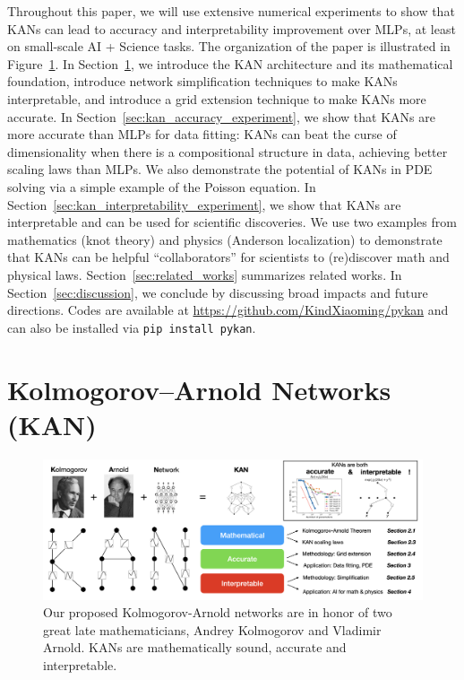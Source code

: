 \documentclass{article}
\numberwithin{equation}{section}
\numberwithin{figure}{section}
\begin{document}
Throughout this paper, we will use extensive numerical experiments to show that KANs can lead to accuracy and interpretability improvement over MLPs, at least on small-scale AI + Science tasks. The organization of the paper is illustrated in Figure~\ref{fig:flow-chart}. In Section~\ref{sec:KAN}, we introduce the KAN architecture and its mathematical foundation, introduce network simplification techniques to make KANs interpretable, and introduce a grid extension technique to make KANs more accurate. In Section~\ref{sec:kan_accuracy_experiment}, we show that KANs are more accurate than MLPs for data fitting: KANs can beat the curse of dimensionality when there is a compositional structure in data, achieving better scaling laws than MLPs. We also demonstrate the potential of KANs in PDE solving via a simple example of the Poisson equation. In Section~\ref{sec:kan_interpretability_experiment}, we show that KANs are interpretable and can be used for scientific discoveries. We use two examples from mathematics (knot theory) and physics (Anderson localization) %
to demonstrate that KANs can be helpful ``collaborators'' for scientists to (re)discover math and physical laws. Section~\ref{sec:related_works} summarizes related works. In Section~\ref{sec:discussion}, we conclude by discussing broad impacts and future directions. Codes are available at \url{https://github.com/KindXiaoming/pykan} and can also be installed via \texttt{pip install pykan}.

\section{Kolmogorov–Arnold Networks (KAN)}\label{sec:KAN}

\begin{figure}[t]
    \centering
    \includegraphics[width=1\linewidth]{figs/flowchart.png}
    \caption{Our proposed Kolmogorov-Arnold networks are in honor of two great late mathematicians, Andrey Kolmogorov and Vladimir Arnold. KANs are mathematically sound, accurate and interpretable.
 }
    \label{fig:flow-chart}
\end{figure}
\end{document}
